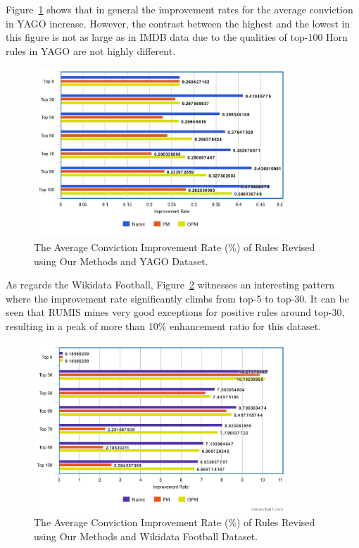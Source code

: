 Figure~\ref{fig_1_5_yago} shows that in general the improvement rates for the average conviction in YAGO increase. However, the contrast between the highest and the lowest in this figure is not as large as in IMDB data due to the qualities of top-100 Horn rules in YAGO are not highly different.

\begin{figure}[ht]
\centering
\includegraphics[width=0.85\textwidth]{figures/table_1_5_yago.jpeg}
\caption{The Average Conviction Improvement Rate (\%) of Rules Revised using Our Methods and YAGO Dataset.}
\label{fig_1_5_yago}
\end{figure}

As regards the Wikidata Football, Figure~\ref{fig_1_5_wikidata} witnesses an interesting pattern where the improvement rate significantly climbs from top-5 to top-30. It can be seen that RUMIS mines very good exceptions for positive rules around top-30, 
resulting in a peak of more than 10\% enhancement ratio for this dataset.

\begin{figure}[ht]
\centering
\includegraphics[width=0.85\textwidth]{figures/table_1_5_wikidata.jpeg}
\caption{The Average Conviction Improvement Rate (\%) of Rules Revised using Our Methods and Wikidata Football Dataset.}
\label{fig_1_5_wikidata}
\end{figure}

